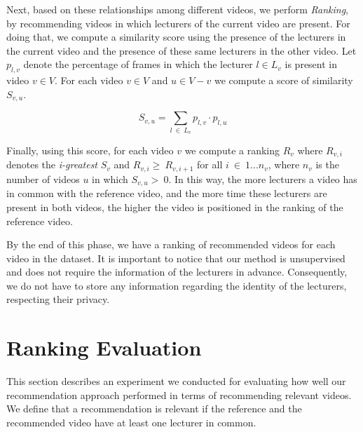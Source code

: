 Next, based on these relationships among different videos, we perform \textit{Ranking}, by recommending videos in which lecturers of the current video are present. 
For doing that, we compute a similarity score using the presence of the lecturers in the current video and the presence of these same lecturers in the other video.
Let $p_{l,v}$ denote the percentage of frames in which the lecturer $l \in L_v$ is present in video $v \in V$. For each video $v \in V$ and $u \in V-v$ we compute a score of similarity $S_{v,u}$.

\begin{equation}
  S_{v,u} = \sum_{l~\in~L_v}{p_{l,v}\cdot{p_{l,u}}}
\end{equation}

Finally, using this score, for each video $v$ we compute a ranking $R_{v}$ where $R_{v,i}$ denotes the \emph{i-greatest} $S_v$ and $R_{v,i}\ge~R_{v,i+1}$ for all $i~\in~1...n_v$, where $n_v$ is the number of videos $u$ in which $S_{v,u}>~0$. 
In this way, the more lecturers a video has in common with the reference video, and the more time these lecturers are present in both videos, the higher the video is positioned in the ranking of the reference video.  

By the end of this phase, we have a ranking of recommended videos for each video in the dataset.
It is important to notice that our method is unsupervised and does not require the information of the lecturers in advance.
Consequently, we do not have to store any information regarding the identity of the lecturers, respecting their privacy.


\section{Ranking Evaluation}
\label{sec:recommendation_ranking_evaluation}

This section describes an experiment we conducted for evaluating how well our recommendation approach performed in terms of recommending relevant videos. We define that a recommendation is relevant if the reference and the recommended video have at least one lecturer in common.

